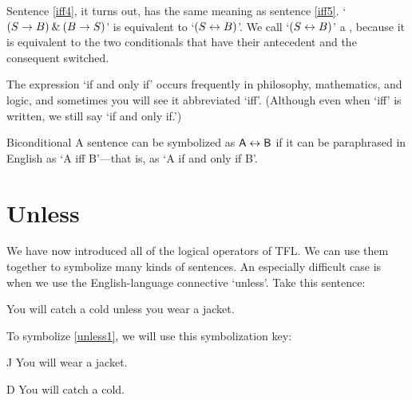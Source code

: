 Sentence \ref{iff4}, it turns out, has the same meaning as sentence \ref{iff5}. `$(S \rightarrow B) \mathbin{\&} (B \rightarrow S)$' is equivalent to `$(S \leftrightarrow B)$'. We call `$(S \leftrightarrow B)$' a , because it is equivalent to the two conditionals that have their antecedent and the consequent switched.

The expression `if and only if' occurs frequently in philosophy, mathematics, and logic, and sometimes you will see it abbreviated `iff'. (Although even when `iff' is written, we still say `if and only if.') 

\begin{factboxy}{Biconditional}
		A sentence can be symbolized as $\mathsf{A} \leftrightarrow \mathsf{B}$ if it can be paraphrased in English as `A iff B'---that is, as `A if and only if B'.
\end{factboxy}
	

\section{Unless}\label{s:unless}
We have now introduced all of the logical operators of TFL. We can use them together to symbolize many kinds of sentences. An especially difficult case is when we use the English-language connective `unless'. Take this sentence:

\begin{earg}
\item[\ex{unless1}] You will catch a cold unless you wear a jacket. 
\end{earg}
To symbolize \ref{unless1}, we will use this symbolization key:
	\begin{ekey}
		\item[J] You will wear a jacket.
		\item[D] You will catch a cold.
	\end{ekey}

